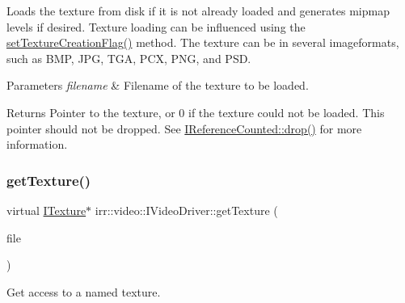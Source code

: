 Loads the texture from disk if it is not already loaded and generates mipmap levels if desired. Texture loading can be influenced using the \hyperlink{classirr_1_1video_1_1IVideoDriver_a868b58a6b86b9e4841ca3879ce246c4e}{set\+Texture\+Creation\+Flag()} method. The texture can be in several imageformats, such as B\+MP, J\+PG, T\+GA, P\+CX, P\+NG, and P\+SD. 
\begin{DoxyParams}{Parameters}
{\em filename} & Filename of the texture to be loaded. \\
\hline
\end{DoxyParams}
\begin{DoxyReturn}{Returns}
Pointer to the texture, or 0 if the texture could not be loaded. This pointer should not be dropped. See \hyperlink{classirr_1_1IReferenceCounted_a03856a09355b89d178090c4a5f738543}{I\+Reference\+Counted\+::drop()} for more information. 
\end{DoxyReturn}
\mbox{\label{classirr_1_1video_1_1IVideoDriver_aaf989c8688ffe2a28a4b8e7b6ec2bce7}} 
\subsubsection{\texorpdfstring{get\+Texture()}{getTexture()}\hspace{0.1cm}{\footnotesize\ttfamily [2/2]}}
{\footnotesize\ttfamily virtual \hyperlink{classirr_1_1video_1_1ITexture}{I\+Texture}$\ast$ irr\+::video\+::\+I\+Video\+Driver\+::get\+Texture (\begin{DoxyParamCaption}\item[{\hyperlink{classirr_1_1io_1_1IReadFile}{io\+::\+I\+Read\+File} $\ast$}]{file }\end{DoxyParamCaption})\hspace{0.3cm}{\ttfamily [pure virtual]}}



Get access to a named texture. 

